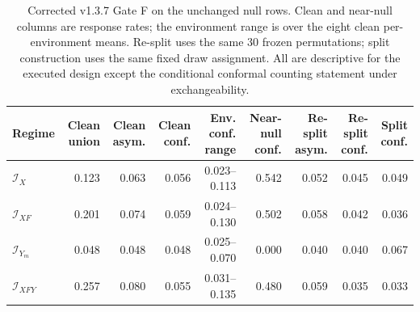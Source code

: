 \begin{table}[!tbp]
\caption{Corrected v1.3.7 Gate F on the unchanged null rows. Clean and near-null columns are response rates; the environment range is over the eight clean per-environment means. Re-split uses the same 30 frozen permutations; split construction uses the same fixed draw assignment. All are descriptive for the executed design except the conditional conformal counting statement under exchangeability.}
\label{tab:v137-gate-f}
\centering\scriptsize\setlength{\tabcolsep}{3pt}
\begin{tabular}{@{}lrrrrrrrr@{}}
\toprule
Regime & Clean union & Clean asym. & Clean conf. & Env. conf. range & Near-null conf. & Re-split asym. & Re-split conf. & Split conf. \\
\midrule
$\mathcal I_X$ & 0.123 & 0.063 & 0.056 & 0.023--0.113 & 0.542 & 0.052 & 0.045 & 0.049 \\
$\mathcal I_{XF}$ & 0.201 & 0.074 & 0.059 & 0.024--0.130 & 0.502 & 0.058 & 0.042 & 0.036 \\
$\mathcal I_{Y_m}$ & 0.048 & 0.048 & 0.048 & 0.025--0.070 & 0.000 & 0.040 & 0.040 & 0.067 \\
$\mathcal I_{XFY}$ & 0.257 & 0.080 & 0.055 & 0.031--0.135 & 0.480 & 0.059 & 0.035 & 0.033 \\
\bottomrule
\end{tabular}
\end{table}
